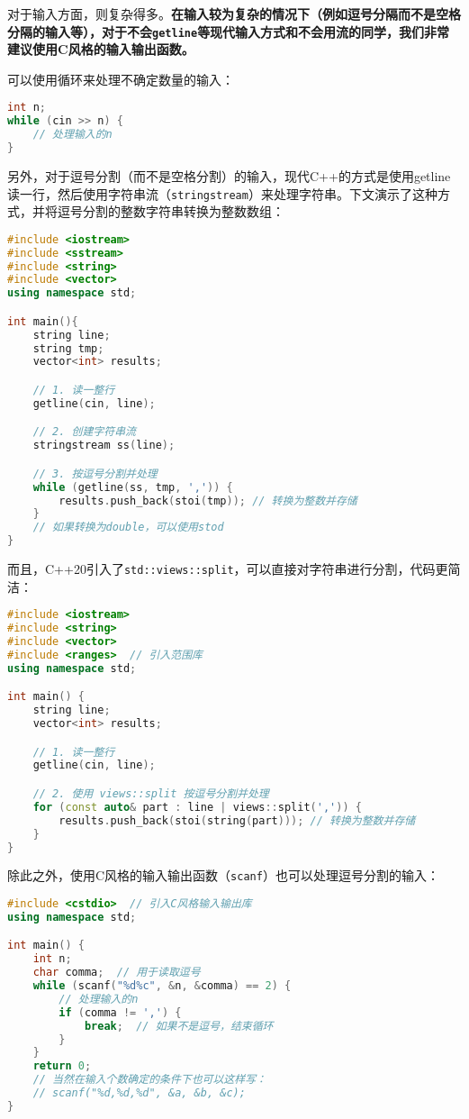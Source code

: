 \documentclass[../main.tex]{subfiles}
\begin{document}
对于输入方面，则复杂得多。{\color{red}\textbf{在输入较为复杂的情况下（例如逗号分隔而不是空格分隔的输入等），对于不会\texttt{getline}等现代输入方式和不会用流的同学，我们非常建议使用C风格的输入输出函数。}}

可以使用循环来处理不确定数量的输入：
\begin{lstlisting}[language=C++]
int n;
while (cin >> n) {
    // 处理输入的n
}
\end{lstlisting}

另外，对于逗号分割（而不是空格分割）的输入，现代C++的方式是使用getline读一行，然后使用字符串流（\texttt{stringstream}）来处理字符串。下文演示了这种方式，并将逗号分割的整数字符串转换为整数数组：
\begin{lstlisting}[language=C++]
#include <iostream>
#include <sstream>
#include <string>
#include <vector>
using namespace std;

int main(){
    string line;
    string tmp;
    vector<int> results;

    // 1. 读一整行
    getline(cin, line);

    // 2. 创建字符串流
    stringstream ss(line);

    // 3. 按逗号分割并处理
    while (getline(ss, tmp, ',')) {
        results.push_back(stoi(tmp)); // 转换为整数并存储
    }
    // 如果转换为double，可以使用stod
}
\end{lstlisting}
而且，C++20引入了\texttt{std::views::split}，可以直接对字符串进行分割，代码更简洁：
\begin{lstlisting}[language=C++]
#include <iostream>
#include <string>
#include <vector>
#include <ranges>  // 引入范围库
using namespace std;

int main() {
    string line;
    vector<int> results;

    // 1. 读一整行
    getline(cin, line);

    // 2. 使用 views::split 按逗号分割并处理
    for (const auto& part : line | views::split(',')) {
        results.push_back(stoi(string(part))); // 转换为整数并存储
    }
}
\end{lstlisting}
除此之外，使用C风格的输入输出函数（\texttt{scanf}）也可以处理逗号分割的输入：
\begin{lstlisting}[language=C++]
#include <cstdio>  // 引入C风格输入输出库
using namespace std;

int main() {
    int n;
    char comma;  // 用于读取逗号
    while (scanf("%d%c", &n, &comma) == 2) {
        // 处理输入的n
        if (comma != ',') {
            break;  // 如果不是逗号，结束循环
        }
    }
    return 0;
    // 当然在输入个数确定的条件下也可以这样写：
    // scanf("%d,%d,%d", &a, &b, &c);
}
\end{lstlisting}
\end{document}
